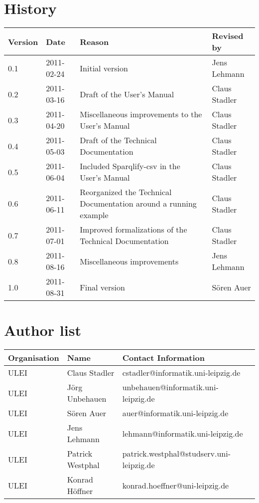 \section*{History}
\begin{center}
\begin{tabular*}{\textwidth}{llp{4.44cm}l} \toprule
\textbf{Version} & \textbf{Date} & \textbf{Reason} & \textbf{Revised by} \\\midrule
0.1 & 2011-02-24 & Initial version & Jens Lehmann \\
0.2 & 2011-03-16 & Draft of the User's Manual & Claus Stadler \\
0.3 & 2011-04-20 & Miscellaneous improvements to the User's Manual & Claus Stadler \\
0.4 & 2011-05-03 & Draft of the Technical Documentation & Claus Stadler \\
0.5 & 2011-06-04 & Included Sparqlify-csv in the User's Manual  & Claus Stadler \\
0.6 & 2011-06-11 & Reorganized the Technical Documentation around a running example & Claus Stadler \\
0.7 & 2011-07-01 & Improved formalizations of the Technical Documentation & Claus Stadler \\
0.8 & 2011-08-16 & Miscellaneous improvements & Jens Lehmann \\
1.0 & 2011-08-31 & Final version & S{\"o}ren Auer \\
\bottomrule
\end{tabular*}
\end{center}

\section*{Author list}

\begin{center}
\begin{tabular*}{\textwidth}{llp{4.44cm}l} \toprule
\textbf{Organisation} & \textbf{Name} & \textbf{Contact Information} \\\midrule
ULEI & Claus Stadler & cstadler@informatik.uni-leipzig.de \\
ULEI & J\"{o}rg Unbehauen & unbehauen@informatik.uni-leipzig.de \\
ULEI & S\"oren Auer & auer@informatik.uni-leipzig.de \\
ULEI & Jens Lehmann & lehmann@informatik.uni-leipzig.de \\
ULEI & Patrick Westphal & patrick.westphal@studserv.uni-leipzig.de \\
ULEI & Konrad H\"offner & konrad.hoeffner@uni-leipzig.de \\
\bottomrule
\end{tabular*}
\end{center}

